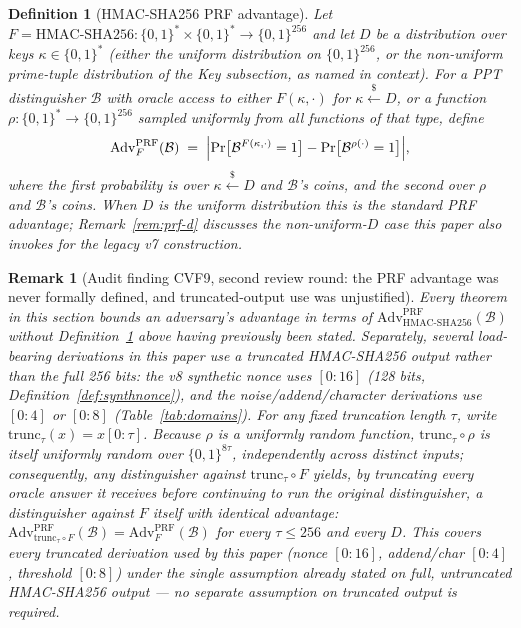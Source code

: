 \documentclass[11pt,a4paper]{article}
\newtheorem{definition}[theorem]{Definition}
\newtheorem{remark}[theorem]{Remark}
\begin{document}
\begin{definition}[HMAC-SHA256 PRF advantage]\label{def:prf-adv}
Let $F=\mathrm{HMAC\text{-}SHA256}:\{0,1\}^{*}\times\{0,1\}^{*}\to\{0,1\}^{256}$
and let $D$ be a distribution over keys $\kappa\in\{0,1\}^{*}$ (either the
uniform distribution on $\{0,1\}^{256}$, or the non-uniform prime-tuple
distribution of the Key subsection, as named in context). For a PPT
distinguisher $\mathcal{B}$ with oracle access to either $F(\kappa,\cdot)$
for $\kappa\xleftarrow{\$}D$, or a function $\rho:\{0,1\}^{*}\to\{0,1\}^{256}$
sampled uniformly from all functions of that type, define
\[
  \mathrm{Adv}^{\mathrm{PRF}}_{F}(\mathcal{B})
  \;=\;
  \Bigl|\Pr\bigl[\mathcal{B}^{F(\kappa,\cdot)}=1\bigr]-\Pr\bigl[\mathcal{B}^{\rho(\cdot)}=1\bigr]\Bigr|,
\]
where the first probability is over $\kappa\xleftarrow{\$}D$ and
$\mathcal{B}$'s coins, and the second over $\rho$ and $\mathcal{B}$'s
coins. When $D$ is the uniform distribution this is the standard PRF
advantage; Remark~\ref{rem:prf-d} discusses the non-uniform-$D$ case this
paper also invokes for the legacy v7 construction.
\end{definition}

\begin{remark}[Audit finding CVF9, second review round: the PRF advantage was never formally defined, and truncated-output use was unjustified]
\label{rem:v2cvf9}
Every theorem in this section bounds an adversary's advantage in terms of
$\mathrm{Adv}^{\mathrm{PRF}}_{\mathrm{HMAC\text{-}SHA256}}(\mathcal{B})$
without Definition~\ref{def:prf-adv} above having previously been stated.
Separately, several load-bearing derivations in this paper use a
\emph{truncated} HMAC-SHA256 output rather than the full 256 bits: the v8
synthetic nonce uses $[0{:}16]$ (128 bits, Definition~\ref{def:synthnonce}),
and the noise/addend/character derivations use $[0{:}4]$ or $[0{:}8]$
(Table~\ref{tab:domains}). For any fixed truncation length $\tau$, write
$\mathrm{trunc}_\tau(x)=x[0{:}\tau]$. Because $\rho$ is a uniformly random
function, $\mathrm{trunc}_\tau\circ\rho$ is itself uniformly random over
$\{0,1\}^{8\tau}$, independently across distinct inputs; consequently, any
distinguisher against $\mathrm{trunc}_\tau\circ F$ yields, by truncating
every oracle answer it receives before continuing to run the original
distinguisher, a distinguisher against $F$ itself with \emph{identical}
advantage:
$\mathrm{Adv}^{\mathrm{PRF}}_{\mathrm{trunc}_\tau\circ F}(\mathcal{B})=\mathrm{Adv}^{\mathrm{PRF}}_{F}(\mathcal{B})$
for every $\tau\leq 256$ and every $D$. This covers every truncated
derivation used by this paper (nonce $[0{:}16]$, addend/char $[0{:}4]$,
threshold $[0{:}8]$) under the single assumption already stated on full,
untruncated HMAC-SHA256 output --- no separate assumption on truncated
output is required.
\end{remark}
\end{document}
